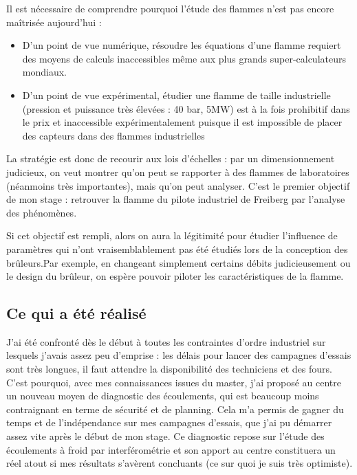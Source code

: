 Il est nécessaire de comprendre pourquoi l'étude des flammes n'est pas encore maîtrisée aujourd'hui :
\begin{itemize}
\item D'un point de vue numérique, résoudre les équations d'une flamme requiert des moyens de calculs inaccessibles même aux plus grands super-calculateurs mondiaux.
\item D'un point de vue expérimental, étudier une flamme de taille industrielle (pression et puissance très élevées : 40 bar, 5MW) est à la fois prohibitif dans le prix et inaccessible expérimentalement puisque il est impossible de placer des capteurs dans des flammes industrielles
\end{itemize}

La stratégie est donc de recourir aux lois d'échelles : par un dimensionnement judicieux, on veut montrer qu'on peut se rapporter à des flammes de laboratoires (néanmoins très importantes), mais qu'on peut analyser. C'est le premier objectif de mon stage : retrouver la flamme du pilote industriel de Freiberg par l'analyse des phénomènes.

Si cet objectif est rempli, alors on aura la légitimité pour étudier l'influence de paramètres qui n'ont vraisemblablement pas été étudiés lors de la conception des brûleurs.Par exemple, en changeant simplement certains débits judicieusement ou le design du brûleur, on espère pouvoir piloter les caractéristiques de la flamme.

\subsection{Ce qui a été réalisé}

J'ai été confronté dès le début à toutes les contraintes d'ordre industriel sur lesquels j'avais assez peu d'emprise : les délais pour lancer des campagnes d'essais sont très longues, il faut attendre la disponibilité des techniciens et des fours. C'est pourquoi, avec mes connaissances issues du master, j'ai proposé au centre un nouveau moyen de diagnostic des écoulements, qui est beaucoup moins contraignant en terme de sécurité et de planning. Cela m'a permis de gagner du temps et de l'indépendance sur mes campagnes d'essais, que j'ai pu démarrer assez vite après le début de mon stage. Ce diagnostic repose sur l'étude des écoulements à froid par interférométrie et son apport au centre constituera un réel atout si mes résultats s'avèrent concluants (ce sur quoi je suis très optimiste).

